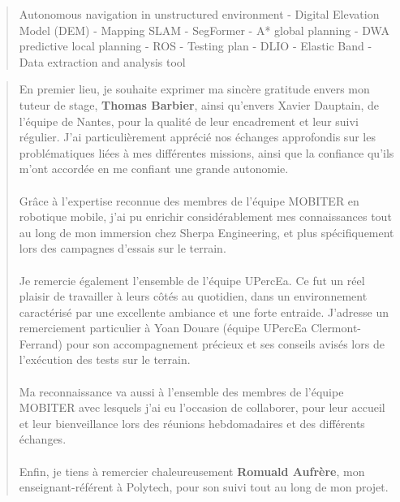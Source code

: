 \documentclass{CoursENSAM}
\begin{document}
\renewcommand{\abstractname}{Keywords}
\begin{abstract}
\begin{center}
    Autonomous navigation in unstructured environment - Digital Elevation Model (DEM) - Mapping SLAM - SegFormer - A* global planning - DWA predictive local planning - ROS - Testing plan - DLIO - Elastic Band - Data extraction and analysis tool
\end{center}
\end{abstract}
\newpage
\renewcommand{\abstractname}{Remerciements}
\begin{abstract}
En premier lieu, je souhaite exprimer ma sincère gratitude envers mon tuteur de stage, \textbf{Thomas Barbier}, ainsi qu'envers Xavier Dauptain, de l'équipe de Nantes, pour la qualité de leur encadrement et leur suivi régulier. J'ai particulièrement apprécié nos échanges approfondis sur les problématiques liées à mes différentes missions, ainsi que la confiance qu'ils m'ont accordée en me confiant une grande autonomie.\\\\
\indent Grâce à l'expertise reconnue des membres de l'équipe MOBITER en robotique mobile, j'ai pu enrichir considérablement mes connaissances tout au long de mon immersion chez Sherpa Engineering, et plus spécifiquement lors des campagnes d'essais sur le terrain.\\\\
\indent Je remercie également l'ensemble de l'équipe UPercEa. Ce fut un réel plaisir de travailler à leurs côtés au quotidien, dans un environnement caractérisé par une excellente ambiance et une forte entraide. J'adresse un remerciement particulier à Yoan Douare (équipe UPercEa Clermont-Ferrand) pour son accompagnement précieux et ses conseils avisés lors de l'exécution des tests sur le terrain.\\\\
\indent Ma reconnaissance va aussi à l'ensemble des membres de l'équipe MOBITER avec lesquels j'ai eu l'occasion de collaborer, pour leur accueil et leur bienveillance lors des réunions hebdomadaires et des différents échanges.\\\\
\indent Enfin, je tiens à remercier chaleureusement \textbf{Romuald Aufrère}, mon enseignant-référent à Polytech, pour son suivi tout au long de mon projet.
\end{abstract}


\newpage
\renewcommand{\thepage}{}
\rfoot{} %
\sectionfont{\centering\color{cyan}{}}
\end{document}
